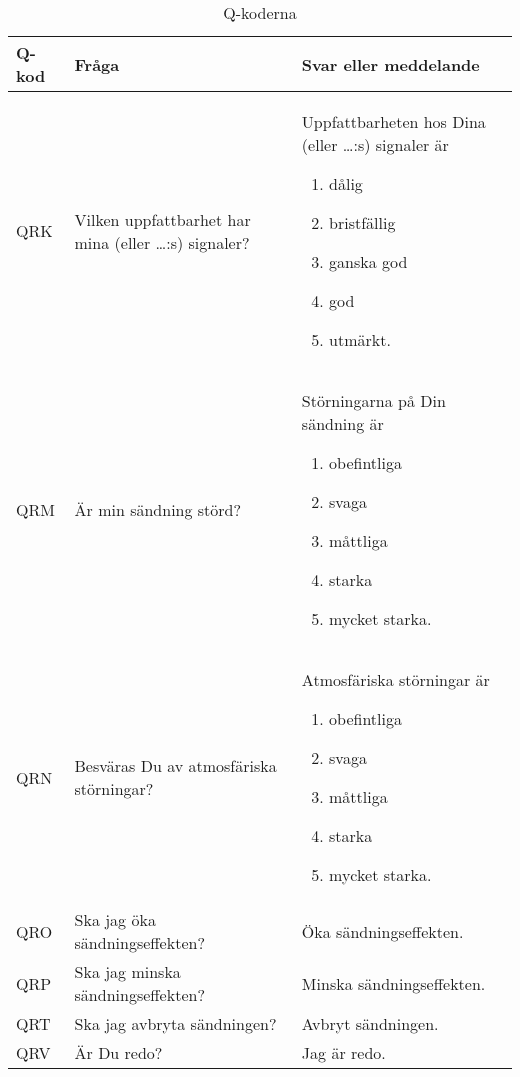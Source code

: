 \begin{table}
  \label{tab:q-kod}
  \caption{Q-koderna}
  \begin{tabular}{lp{6cm}p{6cm}}
    Q-kod & Fråga & Svar eller meddelande \\
    \hline
    QRK &
    Vilken uppfattbarhet har mina (eller \dots:s) signaler?
    &
    Uppfattbarheten hos Dina (eller \dots:s) signaler är
    \vspace{-\topsep}
    \begin{enumerate}[noitemsep]
    \item dålig
    \item bristfällig
    \item ganska god
    \item god
    \item utmärkt.
    \end{enumerate} \\
    QRM &
    Är min sändning störd?
    &
    Störningarna på Din sändning är
    \vspace{-\topsep}
    \begin{enumerate}[noitemsep]
    \item obefintliga
    \item svaga
    \item måttliga
    \item starka
    \item mycket starka.
    \end{enumerate} \\
    QRN
    &
    Besväras Du av atmosfäriska störningar?
    &
    Atmosfäriska störningar är
    \vspace{-\topsep}
    \begin{enumerate}[noitemsep]
    \item obefintliga
    \item svaga
    \item måttliga
    \item starka
    \item mycket starka.
    \end{enumerate} \\
    QRO
    &
    Ska jag öka sändningseffekten?
    &
    Öka sändningseffekten.
    \\
    QRP
    &
    Ska jag minska sändningseffekten?
    &
    Minska sändningseffekten.
    \\
    QRT
    &
    Ska jag avbryta sändningen?
    &
    Avbryt sändningen.
    \\
    QRV
    &
    Är Du redo?
    &
    Jag är redo.

\end{tabular}
\end{table}
